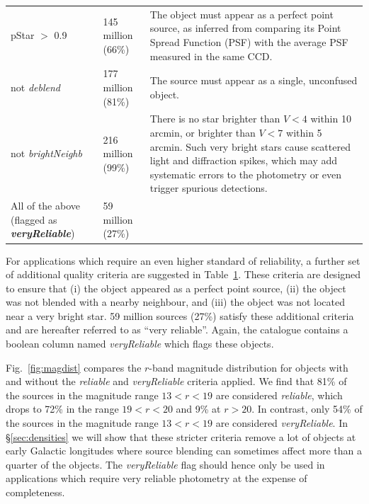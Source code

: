 \documentclass[useAMS,usenatbib]{mn2e}
\begin{document}
\begin{table}
\begin{tabular}{p{8cm}lp{6cm}}
   pStar $>$ 0.9 &
   145 million (66\%) &
   The object must appear as a perfect point source,
   as inferred from comparing its Point Spread Function (PSF)
   with the average PSF measured in the same CCD. \\
   
   {\sc not} \emph{deblend} &
   177 million (81\%) &
   The source must appear as a single, unconfused object. \\
   
   {\sc not} \emph{brightNeighb} &
   216 million (99\%) &
   There is no star brighter than $V < 4$ within 10 arcmin, 
   or brighter than $V < 7$ within 5 arcmin.
   Such very bright stars cause scattered light and diffraction spikes,
   which may add systematic errors to the photometry
   or even trigger spurious detections. \\  
  \hline
  
  All of the above (flagged as {\bf\emph{veryReliable}}) &
  59 million (27\%) & \\
  \hline
\end{tabular}

\label{tab:veryreliable}

\vspace{2cm}
\end{table}

For applications which require
an even higher standard of reliability,
a further set of additional quality criteria
are suggested in Table~\ref{tab:veryreliable}.
These criteria are designed to ensure that
(i) the object appeared as a perfect point source,
(ii) the object was not blended with a nearby neighbour,
and (iii) the object was not located near a very bright star.
59 million sources (27\%) satisfy
these additional criteria 
and are hereafter referred to as ``very reliable''.
Again, the catalogue contains a boolean column
named \emph{veryReliable} which flags these objects.

Fig.~\ref{fig:magdist} compares the $r$-band magnitude
distribution for objects with and without the 
\emph{reliable} and \emph{veryReliable} criteria applied. 
We find that 81\% of the sources 
in the magnitude range $13 < r < 19$
are considered \emph{reliable},
which drops to 72\% in the range $19 < r < 20$
and 9\% at $r>20$.
In contrast, only 54\% of the sources 
in the magnitude range $13 < r < 19$
are considered \emph{veryReliable}.
In \S\ref{sec:densities} we will show that these
stricter criteria remove a lot
of objects at early Galactic longitudes 
where source blending can sometimes affect
more than a quarter of the objects.
The \emph{veryReliable} flag should hence
only be used in applications which require very reliable photometry
at the expense of completeness.
\end{document}
